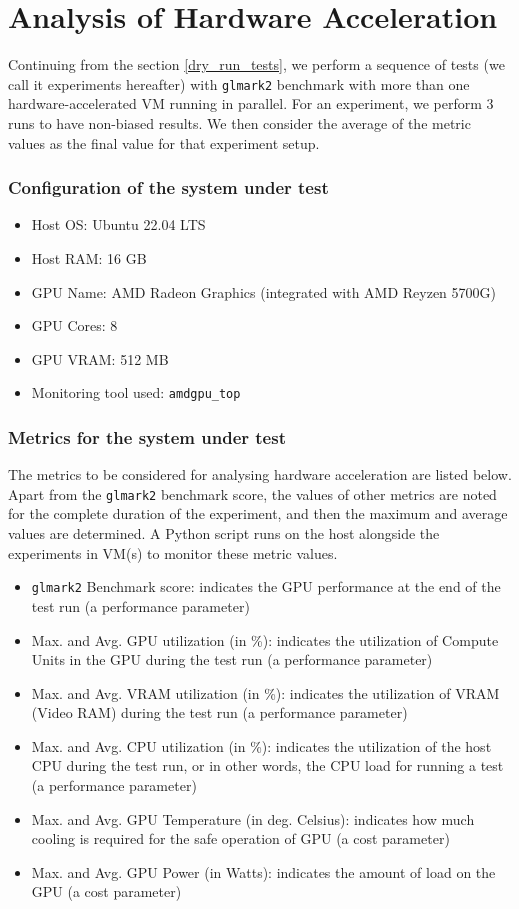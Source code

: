 \documentclass[a4paper,12pt, final]{report}
\begin{document}
\section{Analysis of Hardware Acceleration}
Continuing from the section \ref{dry_run_tests}, we perform a sequence of tests (we call it experiments hereafter) with \verb|glmark2| benchmark with more than one hardware-accelerated VM running in parallel. For an experiment, we perform 3 runs to have non-biased results. We then consider the average of the metric values as the final value for that experiment setup.

\subsubsection{Configuration of the system under test}
\begin{itemize}
    \item Host OS: Ubuntu 22.04 LTS
    \item Host RAM: 16 GB
    \item GPU Name: AMD Radeon Graphics (integrated with AMD Reyzen 5700G)
    \item GPU Cores: 8
    \item GPU VRAM: 512 MB
    \item Monitoring tool used: \verb|amdgpu_top|
\end{itemize}

\subsubsection{Metrics for the system under test}
The metrics to be considered for analysing hardware acceleration are listed below. Apart from the \verb|glmark2| benchmark score, the values of other metrics are noted for the complete duration of the experiment, and then the maximum and average values are determined. A Python script runs on the host alongside the experiments in VM(s) to monitor these metric values.

\begin{itemize}
    \item \verb|glmark2| Benchmark score: indicates the GPU performance at the end of the test run (a performance parameter)
    \item Max. and Avg. GPU utilization (in \%): indicates the utilization of Compute Units in the GPU during the test run (a performance parameter)
    \item Max. and Avg. VRAM utilization (in \%): indicates the utilization of VRAM (Video RAM) during the test run (a performance parameter)
    \item Max. and Avg. CPU utilization (in \%): indicates the utilization of the host CPU during the test run, or in other words, the CPU load for running a test (a performance parameter)
    \item Max. and Avg. GPU Temperature (in deg. Celsius): indicates how much cooling is required for the safe operation of GPU (a cost parameter)
    \item Max. and Avg. GPU Power (in Watts): indicates the amount of load on the GPU (a cost parameter)
\end{itemize}
\end{document}
